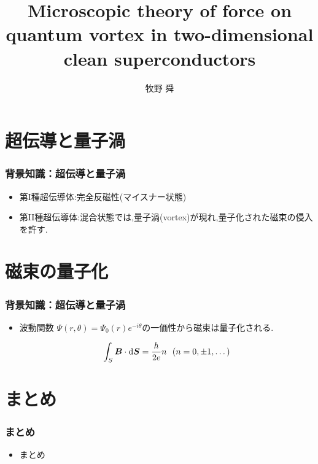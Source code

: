 \documentclass[dvipdfmx,12pt]{beamer}
\title{Microscopic theory of force on quantum vortex in two-dimensional clean superconductors}
\author{牧野 舜}
\institute{Hoge University}
\date{}
\begin{document}
\begin{frame}\frametitle{}
    \titlepage
\end{frame}


\section{超伝導と量子渦}
\begin{frame}
    \frametitle{背景知識：超伝導と量子渦}

    \begin{itemize}
        \item
              第I種超伝導体:完全反磁性(マイスナー状態)
        \item
              第II種超伝導体:混合状態では,量子渦(vortex)が現れ,量子化された磁束の侵入を許す.
    \end{itemize}
\end{frame}

\section{磁束の量子化}
\begin{frame}
    \frametitle{背景知識：超伝導と量子渦}

    \begin{itemize}
        \item
              波動関数 $\Psi(r,\theta)=\Psi_{0}(r)e^{-i\theta}$の一価性から磁束は量子化される.

              \begin{equation}
                  \int_{S} \bm{B}\cdot\mathrm{d}\bm{S} = \frac{h}{2e}n \ \ (n=0,\pm1,\dots) \notag
              \end{equation}
    \end{itemize}
\end{frame}

\section{まとめ}
\begin{frame}
    \frametitle{まとめ}

    \begin{itemize}
        \item まとめ
    \end{itemize}
\end{frame}
\end{document}
